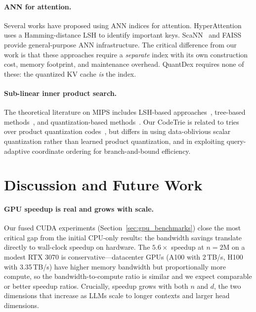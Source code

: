 \documentclass[10pt,twocolumn]{article}
\theoremstyle{definition}
\begin{document}
\paragraph{ANN for attention.}
Several works have proposed using ANN indices for attention.
HyperAttention~\cite{han2023hyperattention} uses a Hamming-distance LSH to
identify important keys.  ScaNN~\cite{scann2020} and FAISS~\cite{faiss2024}
provide general-purpose ANN infrastructure.  The critical difference from our
work is that these approaches require a \emph{separate} index with its own
construction cost, memory footprint, and maintenance overhead.  QuantDex requires
none of these: the quantized KV cache \emph{is} the index.

\paragraph{Sub-linear inner product search.}
The theoretical literature on MIPS includes LSH-based
approaches~\cite{shrivastava2014alsh}, tree-based
methods~\cite{ram2012maximum}, and quantization-based
methods~\cite{guo2016quantization}.  Our CodeTrie is related to tries over
product quantization codes~\cite{babenko2015tree}, but differs in using
data-oblivious scalar quantization rather than learned product quantization,
and in exploiting query-adaptive coordinate ordering for branch-and-bound
efficiency.


\section{Discussion and Future Work}
\label{sec:discussion}

\paragraph{GPU speedup is real and grows with scale.}
Our fused CUDA experiments (Section~\ref{sec:gpu_benchmarks}) close the most
critical gap from the initial CPU-only results: the bandwidth savings translate
directly to wall-clock speedup on hardware.  The $5.6\times$ speedup at
$n = 2$M on a modest RTX 3070 is conservative---datacenter GPUs (A100 with
2\,TB/s, H100 with 3.35\,TB/s) have higher memory bandwidth but proportionally
more compute, so the bandwidth-to-compute ratio is similar and we expect
comparable or better speedup ratios.  Crucially, speedup grows with both $n$ and
$d$, the two dimensions that increase as LLMs scale to longer contexts and
larger head dimensions.
\end{document}
